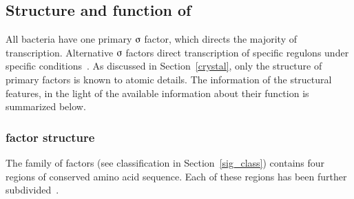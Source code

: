 \subsection{Structure and function of \s{}}

All bacteria have one primary $\sigmaup$ factor, which directs the
majority of transcription. Alternative $\sigmaup$ factors direct
transcription of specific regulons under specific
conditions~\citep[reviewed in][see discussions
below]{Helmann1988,Wosten1998}. As discussed in
Section~\ref{crystal}, only the structure of primary \s{} factors
is known to atomic details. The information of the structural
features, in the light of the available information about their
function is summarized below.

 \subsubsection{\s{} factor structure}

The \s{} family of \s{} factors (see classification in
Section~\ref{sig_class}) contains four regions of conserved amino
acid sequence. Each of these regions has been further
subdivided~\citep[][Figure~\ref{chap1:sigma}]{Lonetto1992}.

